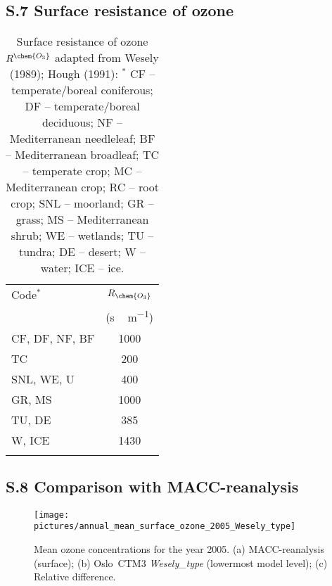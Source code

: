 \documentclass[manuscript]{copernicus}
\begin{document}
\subsection*{S.7 Surface resistance of ozone}
\begin{table*}[!htbp]
  \caption{Surface resistance of ozone $R^\chem{O_3}$ adapted from  Wesely (1989); Hough (1991): $^*$ CF -- temperate/boreal coniferous; DF -- temperate/boreal deciduous; NF -- Mediterranean needleleaf; BF -- Mediterranean broadleaf; TC -- temperate crop; MC -- Mediterranean crop; RC -- root crop; SNL -- moorland; GR -- grass; MS -- Mediterranean shrub; WE -- wetlands; TU -- tundra; DE -- desert; W -- water; ICE -- ice.}
  \begin{tabular}{lc}
    \tophline
    Code$^*$ & $R_\chem{O_3}$\\
         & (\unit{s\,m^{-1}})\\
    \middlehline
    CF, DF, NF, BF &  1000\\
    TC &  200 \\
    SNL, WE, U & 400 \\
    GR, MS  & 1000 \\
    TU, DE  & 385 \\
    W, ICE  & 1430 \\
    \bottomhline
 \end{tabular}
\end{table*}

\subsection*{S.8 Comparison with MACC-reanalysis}
\begin{figure}[!htbp]
  \centering
  \texttt{[image: pictures/annual\_mean\_surface\_ozone\_2005\_Wesely\_type]}
  \caption{Mean ozone concentrations for the year 2005. (a) MACC-reanalysis (surface); (b) Oslo~CTM3 \emph{Wesely\_type} (lowermost model level); (c) Relative difference.}
\end{figure}
\end{document}
